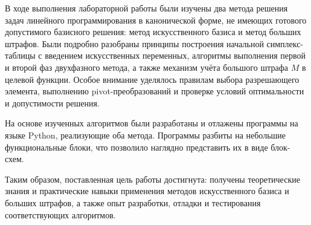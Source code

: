 \documentclass[a4paper,14pt]{extarticle}
\begin{document}
В ходе выполнения лабораторной работы были изучены два метода решения задач линейного программирования в канонической форме, не имеющих готового допустимого базисного решения: метод искусственного базиса и метод больших штрафов. Были подробно разобраны принципы построения начальной симплекс-таблицы с введением искусственных переменных, алгоритмы выполнения первой и второй фаз двухфазного метода, а также механизм учёта большого штрафа \(M\) в целевой функции. Особое внимание уделялось правилам выбора разрешающего элемента, выполнению pivot-преобразований и проверке условий оптимальности и допустимости решения.

На основе изученных алгоритмов были разработаны и отлажены программы на языке Python, реализующие оба метода. Программы разбиты на небольшие функциональные блоки, что позволило наглядно представить их в виде блок-схем.

Таким образом, поставленная цель работы достигнута: получены теоретические знания и практические навыки применения методов искусственного базиса и больших штрафов, а также опыт разработки, отладки и тестирования соответствующих алгоритмов.
\end{document}
